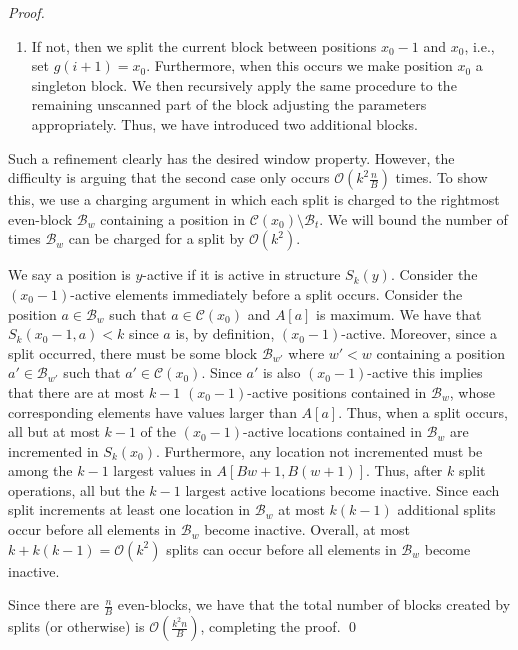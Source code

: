 \documentclass[runningheads]{llncs}
\newcommand{\opset}{\mathcal{C}}
\newcommand{\Oh}{\mathcal{O}}
\begin{document}
\begin{proof}
\begin{enumerate}
\item If not, then we split the current block between positions $x_0 -
  1$ and $x_0$, i.e., set $g(i+1) = x_0$.  Furthermore, when this
  occurs we make position $x_0$ a singleton block. We then recursively
  apply the same procedure to the remaining unscanned part of the
  block adjusting the parameters appropriately.  Thus, we have
  introduced two additional blocks.
\end{enumerate}

Such a refinement clearly has the desired window property.  However,
the difficulty is arguing that the second case only occurs $\Oh(k^2
\frac{n}{B})$ times.  To show this, we use a charging argument in which each
split is charged to the rightmost even-block $\mathcal{B}_{w}$
containing a position in $\opset(x_0) \setminus \mathcal{B}_t$.  We
will bound the number of times $\mathcal{B}_w$ can be charged for a
split by $\Oh(k^2)$.

We say a position is $y$-active if it is active in structure $S_k(y)$.
Consider the $(x_0 - 1)$-active elements immediately before a split
occurs.  Consider the position $a \in \mathcal{B}_w$ such that $a \in
\opset(x_0)$ and $A[a]$ is maximum.  We have that $S_k(x_0-1,a) < k$
since $a$ is, by definition, $(x_0-1)$-active.  Moreover, since a
split occurred, there must be some block $\mathcal{B}_{w'}$ where $w'
< w$ containing a position $a' \in \mathcal{B}_{w'}$ such that $a' \in
\opset(x_0)$.  Since $a'$ is also $(x_0 -1)$-active this implies that
there are at most $k-1$ $(x_0-1)$-active positions contained in
$\mathcal{B}_w$, whose corresponding elements have values larger than
$A[a]$.  Thus, when a split occurs, all but at most $k-1$ of the
$(x_0-1)$-active locations contained in $\mathcal{B}_w$ are
incremented in $S_k(x_0)$.  Furthermore, any location not incremented
must be among the $k-1$ largest values in $A[Bw + 1, B(w+1)]$.  Thus,
after $k$ split operations, all but the $k-1$ largest active locations
become inactive.  Since each split increments at least one location in
$\mathcal{B}_w$ at most $k(k-1)$ additional splits occur before all
elements in $\mathcal{B}_w$ become inactive.  Overall, at most $k +
k(k-1) = \Oh(k^2)$ splits can occur before all elements in
$\mathcal{B}_w$ become inactive.

Since there are $\frac{n}{B}$ even-blocks, we have that the total number of
blocks created by splits (or otherwise) is $\Oh(\frac{k^2 n}{B})$, completing
the proof. \qed
\end{proof}
\end{document}
